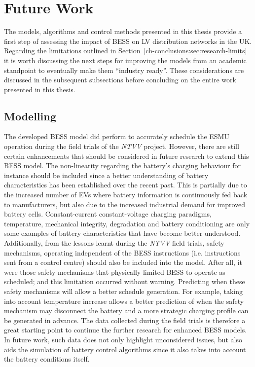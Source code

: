 \section{Future Work}
\label{ch-conclusions:sec:future-work}

The models, algorithms and control methods presented in this thesis provide a first step of assessing the impact of BESS on LV distribution networks in the UK.
Regarding the limitations outlined in Section~\ref{ch-conclusions:sec:research-limits} it is worth discussing the next steps for improving the models from an academic standpoint to eventually make them ``industry ready''.
These considerations are discussed in the subsequent subsections before concluding on the entire work presented in this thesis.

\subsection{Modelling}

The developed BESS model did perform to accurately schedule the ESMU operation during the field trials of the \textit{NTVV} project.
However, there are still certain enhancements that should be considered in future research to extend this BESS model.
The non-linearity regarding the battery's charging behaviour for instance should be included since a better understanding of battery characteristics has been established over the recent past.
This is partially due to the increased number of EVs where battery information is continuously fed back to manufacturers, but also due to the increased industrial demand for improved battery cells.
Constant-current constant-voltage charging paradigms, temperature, mechanical integrity, degradation and battery conditioning are only some examples of battery characteristics that have become better understood.
Additionally, from the lessons learnt during the \textit{NTVV} field trials, safety mechanisms, operating independent of the BESS instructions (i.e. instructions sent from a control centre) should also be included into the model.
After all, it were those safety mechanisms that physically limited BESS to operate as scheduled; and this limitation occurred without warning.
Predicting when these safety mechanisms will allow a better schedule generation.
For example, taking into account temperature increase allows a better prediction of when the safety mechanism may disconnect the battery and a more strategic charging profile can be generated in advance.
The data collected during the field trials is therefore a great starting point to continue the further research for enhanced BESS models.
In future work, such data does not only highlight unconsidered issues, but also aids the simulation of battery control algorithms since it also takes into account the battery conditions itself.

